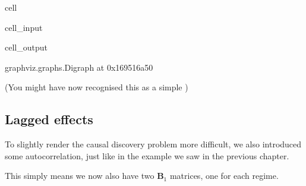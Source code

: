 \documentclass[letterpaper,10pt,english]{jupyterBook}
\begin{document}
\begin{sphinxuseclass}{cell}\begin{sphinxVerbatimInput}

\begin{sphinxuseclass}{cell_input}
\begin{sphinxVerbatim}[commandchars=\\\{\}]
  \PYG{p}{[}\PYG{p}{[}  \PYG{p}{]}
              \PYG{p}{[}  \PYG{p}{]}
              \PYG{p}{[} \PYG{p}{]}\PYG{p}{]}

\end{sphinxVerbatim}

\end{sphinxuseclass}\end{sphinxVerbatimInput}
\begin{sphinxVerbatimOutput}

\begin{sphinxuseclass}{cell_output}
\begin{sphinxVerbatim}[commandchars=\\\{\}]
\PYGZlt{}graphviz.graphs.Digraph at 0x169516a50\PYGZgt{}
\end{sphinxVerbatim}

\end{sphinxuseclass}\end{sphinxVerbatimOutput}

\end{sphinxuseclass}
\sphinxAtStartPar
(You might have now recognised this as a simple )


\subsection{Lagged effects}
\label{\detokenize{notebooks/structural_breaks_example:lagged-effects}}
\sphinxAtStartPar
To slightly render the causal discovery problem more difficult, we also introduced some autocorrelation, just like in the  example we saw in the previous chapter.

\sphinxAtStartPar
This simply means we now also have two \(\mathbf{B}_1\) matrices, one for each regime.
\end{document}
